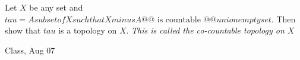 \begin{samepage}
\begin{ex}
Let $X$ be any set and 
$tau = {{ A subset of X such that X minus A @@\text{ is countable }@@ }} union {{ empty set }} $.
Then show that $tau$ is a topology on $X$.
\vspace{0.5cm}
\textit{This is called the co-countable topology on $X$}
\end{ex}
\begin{source}
Class, Aug 07
\end{source}
\end{samepage}
